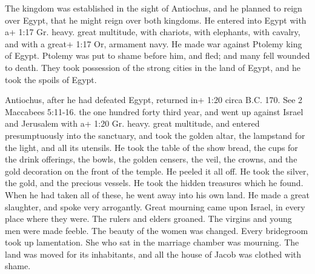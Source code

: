  The kingdom was established in the sight of Antiochus, and
he planned to reign over Egypt, that he might reign over both kingdoms.
 He entered into Egypt with a+ 1:17 Gr. heavy. great
multitude, with chariots, with elephants, with cavalry, and with a
great+ 1:17 Or, armament navy.  He made war against Ptolemy
king of Egypt. Ptolemy was put to shame before him, and fled; and many
fell wounded to death.  They took possession of the strong
cities in the land of Egypt, and he took the spoils of Egypt.

 Antiochus, after he had defeated Egypt, returned in+ 1:20
circa B.C. 170. See 2 Maccabees 5:11-16. the one hundred forty third
year, and went up against Israel and Jerusalem with a+ 1:20 Gr. heavy.
great multitude,  and entered presumptuously into the
sanctuary, and took the golden altar, the lampstand for the light, and
all its utensils.  He took the table of the show bread, the
cups for the drink offerings, the bowls, the golden censers, the veil,
the crowns, and the gold decoration on the front of the temple. He
peeled it all off.  He took the silver, the gold, and the
precious vessels. He took the hidden treasures which he found.
 When he had taken all of these, he went away into his own
land. He made a great slaughter, and spoke very arrogantly.
 Great mourning came upon Israel, in every place where they
were.  The rulers and elders groaned. The virgins and young
men were made feeble. The beauty of the women was changed. 
Every bridegroom took up lamentation. She who sat in the marriage
chamber was mourning.  The land was moved for its
inhabitants, and all the house of Jacob was clothed with shame.

